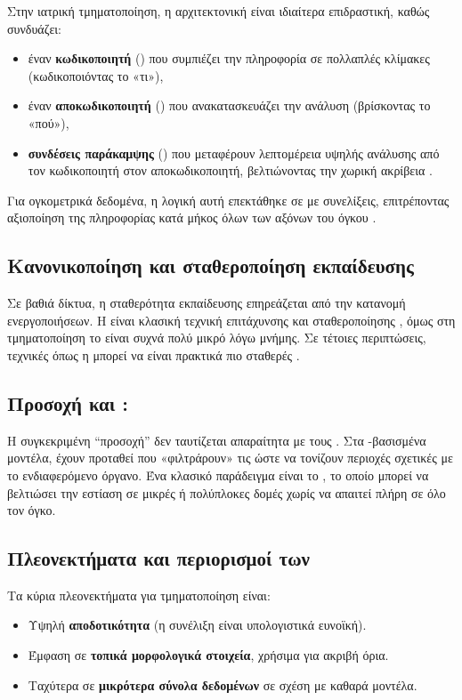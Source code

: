 Στην ιατρική τμηματοποίηση, η αρχιτεκτονική  είναι ιδιαίτερα επιδραστική, καθώς συνδυάζει:
\begin{itemize}
  \item έναν \textbf{κωδικοποιητή} () που συμπιέζει την πληροφορία σε πολλαπλές κλίμακες (κωδικοποιόντας το «τι»),
  \item έναν \textbf{αποκωδικοποιητή} () που ανακατασκευάζει την ανάλυση (βρίσκοντας το «πού»),
  \item \textbf{συνδέσεις παράκαμψης} () που μεταφέρουν λεπτομέρεια υψηλής ανάλυσης από τον κωδικοποιητή στον αποκωδικοποιητή, βελτιώνοντας την χωρική ακρίβεια \cite{ronneberger2015unet}.
\end{itemize}
Για ογκομετρικά δεδομένα, η λογική αυτή επεκτάθηκε σε  με  συνελίξεις, επιτρέποντας αξιοποίηση της
πληροφορίας κατά μήκος όλων των αξόνων του όγκου \cite{cicek20163dunet}.

\subsection{Κανονικοποίηση και σταθεροποίηση εκπαίδευσης}
Σε βαθιά δίκτυα, η σταθερότητα εκπαίδευσης επηρεάζεται από την κατανομή ενεργοποιήσεων. Η  είναι
κλασική τεχνική επιτάχυνσης και σταθεροποίησης \cite{ioffe2015batchnorm}, όμως στη  τμηματοποίηση το 
είναι συχνά πολύ μικρό λόγω μνήμης. Σε τέτοιες περιπτώσεις, τεχνικές όπως η  μπορεί να είναι
πρακτικά πιο σταθερές \cite{wu2018groupnorm}.

\subsection{Προσοχή και : }
Η συγκεκριμένη ``προσοχή'' δεν ταυτίζεται απαραίτητα με τους . Στα -βασισμένα μοντέλα, έχουν προταθεί
\textbf{} που «φιλτράρουν» τις  ώστε να τονίζουν περιοχές σχετικές με το ενδιαφερόμενο όργανο. Ένα κλασικό παράδειγμα είναι το  \cite{oktay2018attentionunet}, το οποίο μπορεί να βελτιώσει
την εστίαση σε μικρές ή πολύπλοκες δομές χωρίς να απαιτεί πλήρη  σε όλο τον όγκο.

\subsection{Πλεονεκτήματα και περιορισμοί των }
Τα κύρια πλεονεκτήματα για τμηματοποίηση είναι:
\begin{itemize}
  \item Υψηλή \textbf{αποδοτικότητα} (η συνέλιξη είναι υπολογιστικά ευνοϊκή).
  \item Έμφαση σε \textbf{τοπικά μορφολογικά στοιχεία}, χρήσιμα για ακριβή όρια.
  \item Ταχύτερα σε \textbf{μικρότερα σύνολα δεδομένων} σε σχέση με καθαρά  μοντέ\-λα.
\end{itemize}

